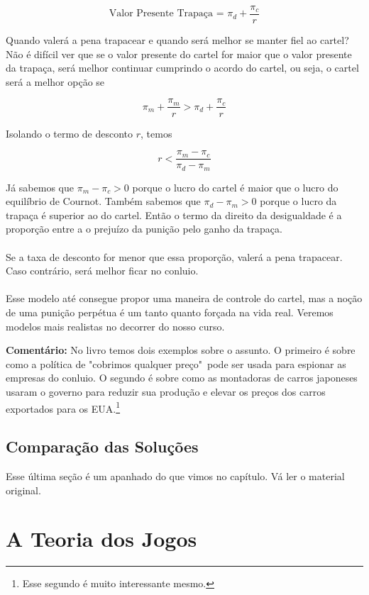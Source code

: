 \documentclass[a4paper,11pt,oneside]{book}
\theoremstyle{definition}
\theoremstyle{break}
\begin{document}
$$ \textrm{Valor Presente Trapaça = } \pi_d + \frac{\pi_c}{r} $$

Quando valerá a pena trapacear e quando será melhor se manter fiel ao cartel? Não é difícil ver que se o valor presente do cartel for maior que o valor presente da trapaça, será melhor continuar cumprindo o acordo do cartel, ou seja, o cartel será a melhor opção se

$$ \pi_m + \frac{\pi_m}{r} > \pi_d + \frac{\pi_c}{r} $$

Isolando o termo de desconto $r$, temos

$$ r < \frac{\pi_m - \pi_c}{\pi_d - \pi_m} $$

Já sabemos que $\pi_m - \pi_c > 0$ porque o lucro do cartel é maior que o lucro do equilíbrio de Cournot. Também sabemos que $\pi_d - \pi_m > 0$ porque o lucro da trapaça é superior ao do cartel. Então o termo da direito da desigualdade é a proporção entre a o prejuízo da punição pelo ganho da trapaça.
\\
\\
Se a taxa de desconto for menor que essa proporção, valerá a pena trapacear. Caso contrário, será melhor ficar no conluio.
\\
\\
Esse modelo até consegue propor uma maneira de controle do cartel, mas a noção de uma punição perpétua é um tanto quanto forçada na vida real. Veremos modelos mais realistas no decorrer do nosso curso.

\textbf{Comentário:} No livro temos dois exemplos sobre o assunto. O primeiro é sobre como a política de "cobrimos qualquer preço"\ pode ser usada para espionar as empresas do conluio.  O segundo é sobre como as montadoras de carros japoneses usaram o governo para reduzir sua produção e elevar os preços dos carros exportados para os EUA.\footnote{Esse segundo é muito interessante mesmo.}

\section{Comparação das Soluções}

Esse última seção é um apanhado do que vimos no capítulo. Vá ler o material original.

\chapter{A Teoria dos Jogos}
\end{document}
